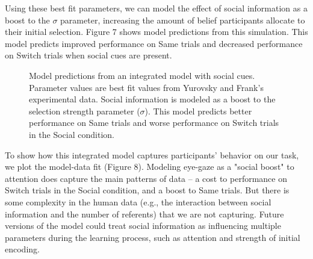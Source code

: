 \documentclass[man]{apa2}
\begin{document}
Using these best fit parameters, we can model the effect of social information as a boost to the $\sigma$ parameter, increasing the amount of belief participants allocate to their initial selection. Figure 7 shows model predictions from this simulation. This model predicts improved performance on Same trials and decreased performance on Switch trials when social cues are present. 


%
\begin{figure}[H]
	\centering
	\caption{Model predictions from an integrated model with social cues. Parameter values are best fit values from Yurovsky and Frank's experimental data. Social information is modeled as a boost to the selection strength parameter ($\sigma$). This model predicts better performance on Same trials and worse performance on Switch trials in the Social condition.}
\end{figure}
%


To show how this integrated model captures participants' behavior on our task, we plot the model-data fit (Figure 8). Modeling eye-gaze as a "social boost" to attention does capture the main patterns of data -- a cost to performance on Switch trials in the Social condition, and a boost to Same trials. But there is some complexity in the human data (e.g., the interaction between social information and the number of referents) that we are not capturing. Future versions of the model could treat social information as influencing multiple parameters during the learning process, such as attention and strength of initial encoding.  
\end{document}
